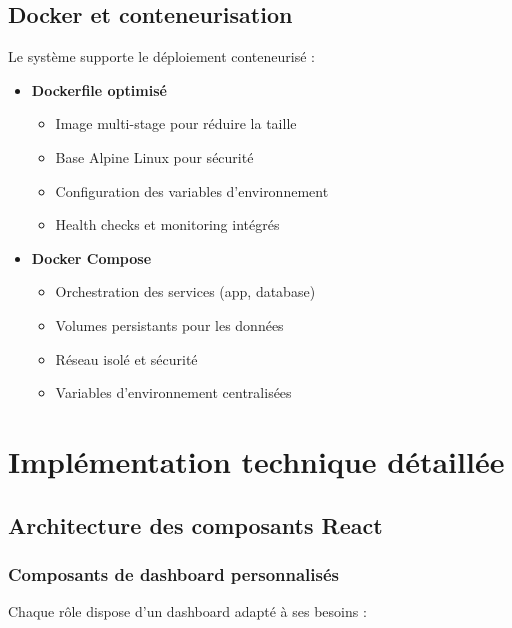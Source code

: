 \documentclass[12pt,a4paper]{report}
\begin{document}
\subsection{Docker et conteneurisation}
Le système supporte le déploiement conteneurisé :

\begin{itemize}
\item \textbf{Dockerfile optimisé}
  \begin{itemize}
  \item Image multi-stage pour réduire la taille
  \item Base Alpine Linux pour sécurité
  \item Configuration des variables d'environnement
  \item Health checks et monitoring intégrés
  \end{itemize}

\item \textbf{Docker Compose}
  \begin{itemize}
  \item Orchestration des services (app, database)
  \item Volumes persistants pour les données
  \item Réseau isolé et sécurité
  \item Variables d'environnement centralisées
  \end{itemize}
\end{itemize}

\section{Implémentation technique détaillée}

\subsection{Architecture des composants React}

\subsubsection{Composants de dashboard personnalisés}
Chaque rôle dispose d'un dashboard adapté à ses besoins :
\end{document}
